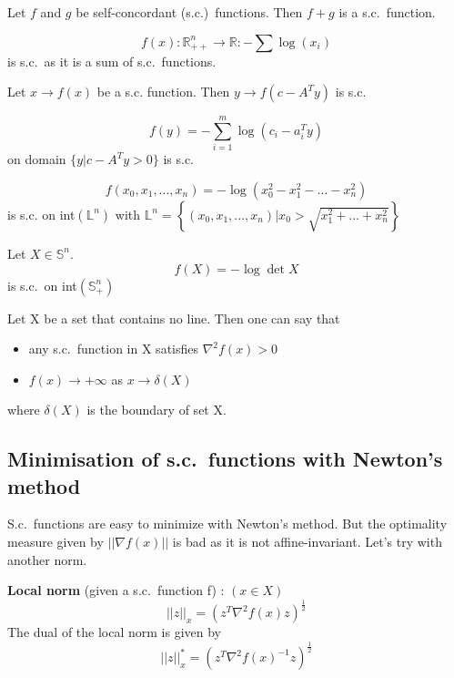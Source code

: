\begin{property}
Let $f$ and $g$ be self-concordant (s.c.)\ functions. Then $f+g$ is a s.c.\ function.
\end{property}

\begin{example}
\begin{leftbar}
$$f(x) : \mathbb{R}_{++}^n \rightarrow \mathbb{R} : -\sum \log{(x_i)}$$ is s.c.\ as it is a sum of s.c.\ functions.
\end{leftbar}
\end{example}

\begin{property}
Let $x \rightarrow f(x)$ be a s.c. function. Then $y \rightarrow f(c-A^Ty)$ is s.c.\
\end{property}

\begin{example}
\begin{leftbar}
$$f(y) = - \sum\limits_{i=1}^m \log{(c_i-a_i^Ty)}$$ on domain $\{y|c-A^Ty > 0\}$ is s.c.\
\end{leftbar}
\end{example}

\begin{example}
\begin{leftbar}
$$f(x_0,x_1,...,x_n) = -\log{(x_0^2-x_1^2-...-x_n^2)}$$ is s.c. on int$(\mathbb{L}^n)$ with $\mathbb{L}^n = \left\{(x_0,x_1,...,x_n) | x_0 > \sqrt{x_1^2+...+x_n^2}\right\}$
\end{leftbar}
\end{example}

\begin{example}
\begin{leftbar}
Let $X \in \mathbb{S}^n$.
$$f(X) = -\log{\det{X}}$$
is s.c.\ on int$(\mathbb{S}_+^n)$
\end{leftbar}
\end{example}

\begin{property}
Let X be a set that contains no line. Then one can say that
\begin{itemize}
\item any s.c.\ function in X satisfies $\nabla^2 f(x) > 0$
\item $f(x) \rightarrow + \infty$ as $x \rightarrow \delta(X)$
\end{itemize}
where $\delta(X)$ is the boundary of set X.
\end{property}

\subsection{Minimisation of s.c.\ functions with Newton's method}
S.c.\ functions are easy to minimize with Newton's method. But the optimality measure given by $\left|| \nabla f(x) \right||$ is bad as it is not affine-invariant. Let's try with another norm.
\begin{definition} \textbf{Local norm} (given a s.c.\ function f) : $(x \in X)$ 
$$
||z||_x  = (z^T \nabla^2f(x)z)^{\frac{1}{2}}
$$
The dual of the local norm is given by
$$
||z||^*_x  = (z^T \nabla^2f(x)^{-1}z)^{\frac{1}{2}}
$$
\end{definition}

